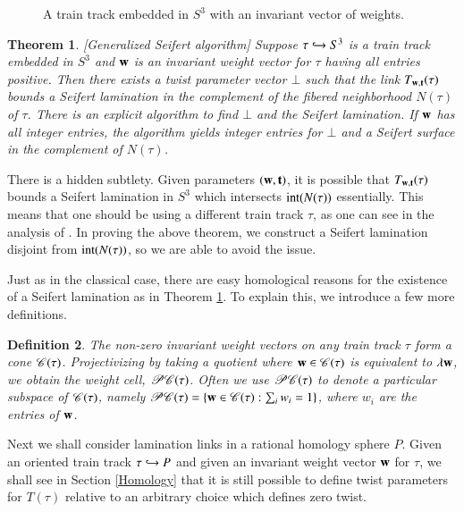 \documentclass[12pt]{article}
\newtheorem{thm}{Theorem}[section] \newtheorem{lemma}[thm]{Lemma}
\newtheorem{defn}[thm]{Definition}
\theoremstyle{remark}
\begin{document}
\begin{figure}[H]
\centering
{}
\caption{\footnotesize A train track embedded in $S^3$ with an invariant vector of weights.}
\label{TrainTrack}
\end{figure}


\begin{thm}\label{Seifert} [Generalized Seifert algorithm] Suppose $\tau\hookrightarrow S^3$ is a train track embedded in $S^3$ and ${\bf w}$ is an invariant weight vector  for $\tau$ having all entries positive.   Then there exists a twist parameter vector $\bot$ such that the link  $T_{{\bf w},{\bf t}}(\tau)$ bounds a Seifert lamination in the complement of the fibered neighborhood $N(\tau)$ of $\tau$.   There is an explicit algorithm to find $\bot$ and the Seifert lamination.   If ${\bf w}$ has all integer entries, the algorithm yields integer entries for $\bot$ and a Seifert surface in the complement of $N(\tau)$.
\end{thm}

There is a hidden subtlety.  Given parameters $({\bf w},{\bf t})$, it is possible that $T_{{\bf w},{\bf t}}(\tau)$ bounds a Seifert lamination in $S^3$ which intersects ${\rm int}(N(\tau))$ essentially.   This means that one should be using a different train track $\tau$, as one can see in the analysis of \cite{UO:LamLinks}. In proving the above theorem, we construct a Seifert lamination disjoint from ${\rm int}(N(\tau))$, so we are able to avoid the issue. 

Just as in the classical case, there are easy homological reasons for the existence of a Seifert lamination as in Theorem \ref{Seifert}.  To explain this, we introduce a few more definitions.

\begin{defn}
The non-zero invariant weight vectors on any train track $\tau$ form a cone $\mathscr{C}(\tau)$.   Projectivizing by taking a quotient where ${\bf w}\in \mathscr{C}(\tau)$ is equivalent to $\lambda{\bf w}$, we obtain the {\it weight cell}, $\mathscr{PC}(\tau)$.   Often we use $\mathscr{PC}(\tau)$ to denote a particular subspace of $\mathscr{C}(\tau)$, namely $\mathscr{PC}(\tau)=\{{\bf w}\in \mathscr{C}(\tau):\sum_iw_i=1\}$, where $w_i$ are the entries of ${\bf w}$.
\end{defn}

Next we shall consider lamination links in a rational homology sphere $P$.   Given an oriented train track $\tau\hookrightarrow P$ and given an invariant weight vector ${\bf w}$ for $\tau$, we shall see in Section \ref{Homology} that it is still possible to define twist parameters for $T(\tau)$ relative to an arbitrary choice which defines zero twist.
\end{document}
